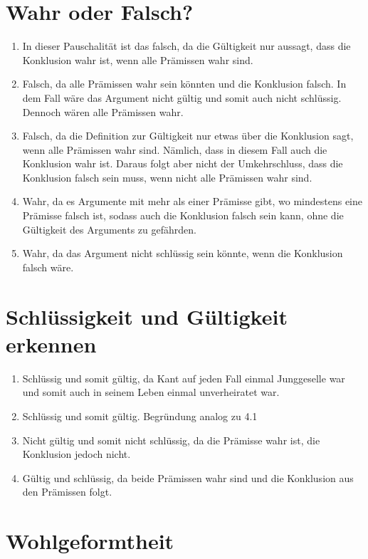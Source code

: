 \documentclass[10pt,a4paper,oneside,ngerman,numbers=noenddot]{scrartcl}
\def\thesection{\arabic{section}.}
\begin{document}
\section{Wahr oder Falsch?} %

\begin{enumerate}[label=\thesection\arabic*]
    \item In dieser Pauschalität ist das falsch, da die Gültigkeit nur aussagt,
    dass die Konklusion wahr ist, wenn alle Prämissen wahr sind.
    \item Falsch, da alle Prämissen wahr sein könnten und die Konklusion falsch.
    In dem Fall wäre das Argument nicht gültig und somit auch nicht schlüssig.
    Dennoch wären alle Prämissen wahr.
    \item Falsch, da die Definition zur Gültigkeit nur etwas über die Konklusion
    sagt, wenn alle Prämissen wahr sind. Nämlich, dass in diesem Fall auch die
    Konklusion wahr ist. Daraus folgt aber nicht der Umkehrschluss, dass die
    Konklusion falsch sein muss, wenn nicht alle Prämissen wahr sind.
    \item Wahr, da es Argumente mit mehr als einer Prämisse gibt, wo mindestens
    eine Prämisse falsch ist, sodass auch die Konklusion falsch sein kann, ohne
    die Gültigkeit des Arguments zu gefährden.
    \item Wahr, da das Argument nicht schlüssig sein könnte, wenn die Konklusion
    falsch wäre.
\end{enumerate}

\section{Schlüssigkeit und Gültigkeit erkennen} %

\begin{enumerate}[label=\thesection\arabic*]
    \item Schlüssig und somit gültig, da Kant auf jeden Fall einmal Junggeselle
    war und somit auch in seinem Leben einmal unverheiratet war.
    \item Schlüssig und somit gültig. Begründung analog zu 4.1
    \item Nicht gültig und somit nicht schlüssig, da die Prämisse wahr ist,
    die Konklusion jedoch nicht.
    \item Gültig und schlüssig, da beide Prämissen wahr sind und die Konklusion
    aus den Prämissen folgt.
\end{enumerate}

\section{Wohlgeformtheit} %
\end{document}
